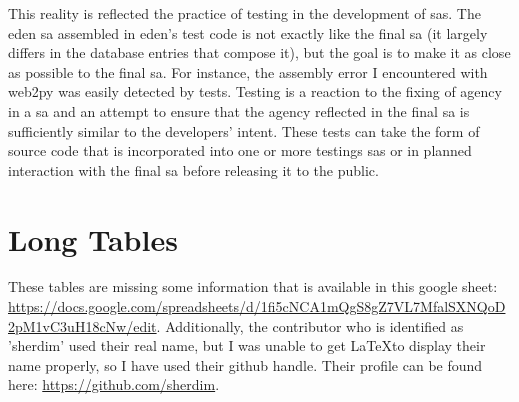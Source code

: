 \documentclass[a4paper,man,natbib,floatsintext]{apa6}
\begin{document}
   This reality is reflected the practice of testing in the development of \glspl{sa}. The \acrshort{eden} \gls{sa} assembled in \acrshort{eden}'s test code is not exactly like the final \gls{sa} (it largely differs in the database entries that compose it), but the goal is to make it as close as possible to the final \gls{sa}. For instance, the assembly error I encountered with web2py was easily detected by tests. Testing is a reaction to the fixing of agency in a \gls{sa} and an attempt to ensure that the agency reflected in the final \gls{sa} is sufficiently similar to the developers' intent. These tests can take the form of source code that is incorporated into one or more testings \glspl{sa} or in planned interaction with the final \gls{sa} before releasing it to the public. 

    
    \printnoidxglossaries

   \section*{Long Tables}
   These tables are missing some information that is available in this google sheet: \url{https://docs.google.com/spreadsheets/d/1fi5cNCA1mQgS8gZ7VL7MfalSXNQoD2pM1vC3uH18cNw/edit}. Additionally, the contributor who is identified as 'sherdim' used their real name, but I was unable to get \LaTeX to display their name properly, so I have used their github handle. Their profile can be found here: \url{https://github.com/sherdim}.
\end{document}
